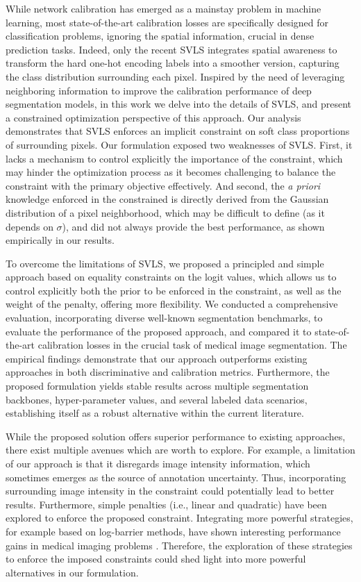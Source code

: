\documentclass[twocolumn,final,10pt]{elsarticle}
\newcommand{\rev}[1]{{\color{black}#1}}
\begin{document}
\rev{While network calibration has emerged as a mainstay problem in machine learning, most state-of-the-art calibration losses are specifically designed for classification problems, ignoring the spatial information, crucial in dense prediction tasks. Indeed, only the recent SVLS integrates spatial awareness to transform the hard one-hot encoding labels into a smoother version, capturing the class distribution surrounding each pixel. Inspired by the need of leveraging neighboring information to improve the calibration performance of deep segmentation models, in this work we delve into the details of SVLS, and present a constrained optimization perspective of this approach. Our analysis demonstrates that SVLS enforces an implicit constraint on soft class proportions of surrounding pixels. Our formulation exposed two weaknesses of SVLS. First, it lacks a mechanism to
control explicitly the importance of the constraint, which
may hinder the optimization process as it becomes challenging to balance the constraint with the primary objective effectively. And second, the \textit{a priori} knowledge enforced in the constrained is directly derived from the Gaussian distribution of a pixel neighborhood, which may be difficult to define (as it depends on $\sigma$), and did not always provide the best performance, as shown empirically in our results.}

\rev{To overcome the limitations of SVLS, we proposed a principled and simple approach based on equality constraints on the logit values, which allows us to control explicitly both
the prior to be enforced in the constraint, as well as the weight of the penalty, offering more flexibility. We conducted a comprehensive evaluation, incorporating diverse well-known segmentation benchmarks, to evaluate the performance of the proposed approach, and compared it to state-of-the-art calibration losses in the crucial task of medical image segmentation. The empirical findings demonstrate that our approach outperforms existing approaches in both discriminative and calibration metrics. Furthermore, the proposed formulation yields stable results across multiple segmentation backbones, hyper-parameter values, and several labeled data scenarios, establishing itself as a robust alternative within the current literature.}

\rev{While the proposed solution offers superior performance to existing approaches, there exist multiple avenues which are worth to explore. For example, a limitation of our approach is that it disregards image intensity information, which sometimes emerges as the source of annotation uncertainty. Thus, incorporating surrounding image intensity in the constraint could potentially lead to better results. Furthermore, simple penalties (i.e., linear and quadratic) have been explored to enforce the proposed constraint. Integrating more powerful strategies, for example based on log-barrier methods, have shown interesting performance gains in medical imaging problems \citep{kervadec2022constrained}. Therefore, the exploration of these strategies to enforce the imposed constraints could shed light into more powerful alternatives in our formulation. }
\end{document}
